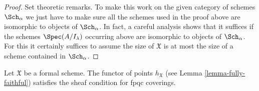 \begin{proof}
\medskip\noindent
Set theoretic remarks. To make this work on the given category
of schemes $\Sch_\alpha$ we just have to make sure all the
schemes used in the proof above are isomorphic to objects of $\Sch_\alpha$.
In fact, a careful analysis shows that it suffices if the
schemes $\Spec(A/I_\lambda)$ occurring above are isomorphic to
objects of $\Sch_\alpha$. For this it certainly suffices to assume
the size of $\mathfrak X$ is at most the size of
a scheme contained in $\Sch_\alpha$.
\end{proof}

\begin{lemma}
\label{lemma-formal-scheme-sheaf-fppf}
Let $\mathfrak X$ be a formal scheme. The functor of points
$h_\mathfrak X$ (see Lemma \ref{lemma-fully-faithful})
satisfies the sheaf condition for fpqc coverings.
\end{lemma}


